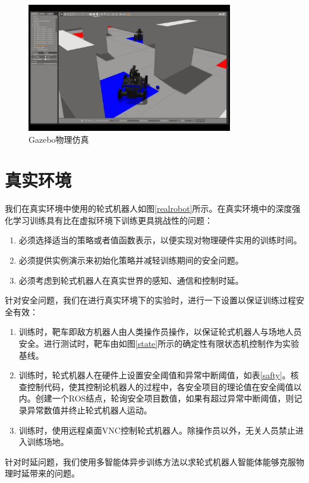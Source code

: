 \begin{figure}[ht]
  \centering
  \includegraphics[width=0.80\textwidth]{figures/gazebo.png}
  \caption{Gazebo物理仿真}\label{gazebo}
\end{figure}

\section{真实环境}
我们在真实环境中使用的轮式机器人如图\ref{realrobot}所示。在真实环境中的深度强化学习训练具有比在虚拟环境下训练更具挑战性的问题：
\begin{enumerate}
  \item 必须选择适当的策略或者值函数表示，以便实现对物理硬件实用的训练时间。
  \item 必须提供实例演示来初始化策略并减轻训练期间的安全问题。
  \item 必须考虑到轮式机器人在真实世界的感知、通信和控制时延。
\end{enumerate}

针对安全问题，我们在进行真实环境下的实验时，进行一下设置以保证训练过程安全有效：
\begin{enumerate}
  \item 训练时，靶车即敌方机器人由人类操作员操作，以保证轮式机器人与场地人员安全。进行测试时，靶车由如图\ref{state}所示的确定性有限状态机控制作为实验基线。
  \item 训练时，轮式机器人在硬件上设置安全阈值和异常中断阈值，如表\ref{safty}。核查控制代码，使其控制论机器人的过程中，各安全项目的理论值在安全阈值以内。创建一个ROS结点，轮询安全项目数值，如果有超过异常中断阈值，则记录异常数值并终止轮式机器人运动。
  \item 训练时，使用远程桌面VNC控制轮式机器人。除操作员以外，无关人员禁止进入训练场地。
\end{enumerate}

针对时延问题，我们使用多智能体异步训练方法以求轮式机器人智能体能够克服物理时延带来的问题。

